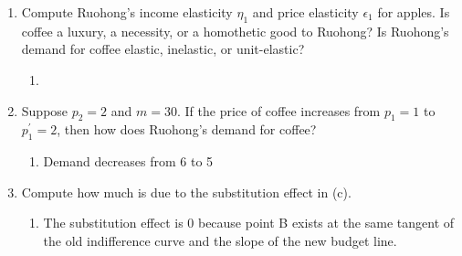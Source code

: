 \documentclass[11pt]{article}
\begin{document}
\begin{enumerate}
\begin{enumerate}
        \item Compute Ruohong's income elasticity $\eta_{1}$ and price elasticity $\epsilon_{1}$ for apples. Is coffee a luxury, a necessity, or a homothetic good to Ruohong? Is Ruohong's demand for coffee elastic, inelastic, or unit-elastic?
        \begin{enumerate}
            \item 
        \end{enumerate}

        \item Suppose $p_{2}=2$ and $m=30$. If the price of coffee increases from $p_{1}=1$ to $p_{1}^{\prime}=2$, then how does Ruohong's demand for coffee?
        \begin{enumerate}
            \item Demand decreases from 6 to 5
        \end{enumerate}

        \item Compute how much is due to the substitution effect in (c).
        \begin{enumerate}
            \item The substitution effect is 0 because point B exists at the same tangent of the old indifference curve and the slope of the new budget line.
        \end{enumerate}

    \end{enumerate}



\end{enumerate}
\end{document}
